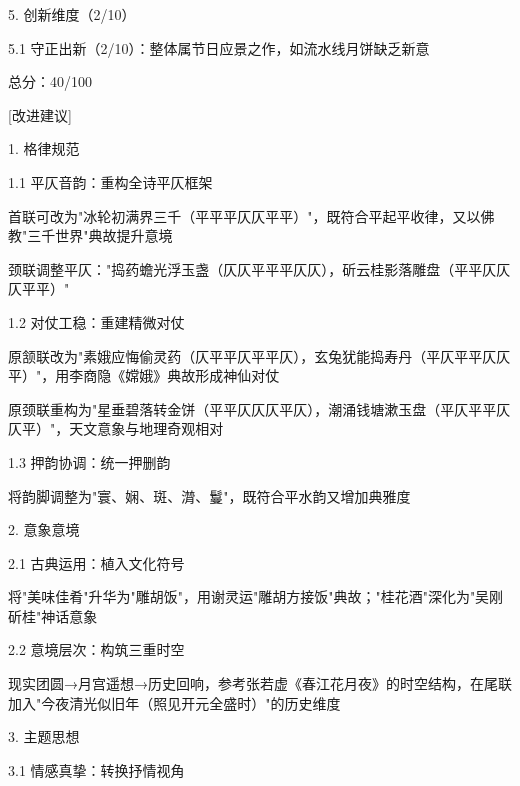\begin{tcolorbox}[
    breakable,            %
    colback=white, %
    colframe=black, 
    boxrule=1pt,        %
    arc=0mm             %
    ]
    5. 创新维度（2/10）\par
    \hspace{2em}5.1 守正出新（2/10）：整体属节日应景之作，如流水线月饼缺乏新意\par
    总分：40/100

    [改进建议]\par
    1. 格律规范\par
    \hspace{2em}1.1 平仄音韵：重构全诗平仄框架\par
    \hspace{2em}首联可改为"冰轮初满界三千（平平平仄仄平平）"，既符合平起平收律，又以佛教"三千世界"典故提升意境\par
    \hspace{2em}颈联调整平仄："捣药蟾光浮玉盏（仄仄平平平仄仄），斫云桂影落雕盘（平平仄仄仄平平）"\par
    \hspace{2em}1.2 对仗工稳：重建精微对仗\par
    \hspace{2em}原颔联改为"素娥应悔偷灵药（仄平平仄平平仄），玄兔犹能捣寿丹（平仄平平仄仄平）"，用李商隐《嫦娥》典故形成神仙对仗\par
    \hspace{2em}原颈联重构为"星垂碧落转金饼（平平仄仄仄平仄），潮涌钱塘漱玉盘（平仄平平仄仄平）"，天文意象与地理奇观相对\par
    \hspace{2em}1.3 押韵协调：统一押删韵\par
    \hspace{2em}将韵脚调整为"寰、娴、斑、潸、鬘"，既符合平水韵又增加典雅度\par
    2. 意象意境\par
    \hspace{2em}2.1 古典运用：植入文化符号\par
    \hspace{2em}将"美味佳肴"升华为"雕胡饭"，用谢灵运"雕胡方接饭"典故；"桂花酒"深化为"吴刚斫桂"神话意象\par
    \hspace{2em}2.2 意境层次：构筑三重时空\par
    \hspace{2em}现实团圆→月宫遥想→历史回响，参考张若虚《春江花月夜》的时空结构，在尾联加入"今夜清光似旧年（照见开元全盛时）"的历史维度\par
    3. 主题思想\par
    \hspace{2em} 3.1 情感真挚：转换抒情视角\par

\end{tcolorbox}

